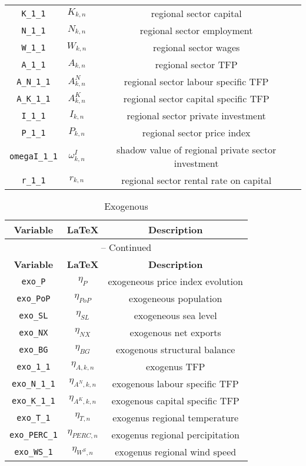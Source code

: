 \begin{center}
\begin{longtable}{ccc}
\texttt{K\_1\_1} & ${K_{k,n}}$ & regional sector capital\\
\texttt{N\_1\_1} & ${N_{k,n}}$ & regional sector employment\\
\texttt{W\_1\_1} & ${W_{k,n}}$ & regional sector wages\\
\texttt{A\_1\_1} & ${A_{k,n}}$ & regional sector TFP\\
\texttt{A\_N\_1\_1} & ${A^{N}_{k,n}}$ & regional sector labour specific TFP\\
\texttt{A\_K\_1\_1} & ${A^{K}_{k,n}}$ & regional sector capital specific TFP\\
\texttt{I\_1\_1} & ${I_{k,n}}$ & regional sector private investment\\
\texttt{P\_1\_1} & ${P_{k,n}}$ & regional sector price index\\
\texttt{omegaI\_1\_1} & ${\omega^I_{k,n}}$ & shadow value of regional private sector investment\\
\texttt{r\_1\_1} & ${r_{k,n}}$ & regional sector rental rate on capital\\
\hline%
\end{longtable}
\end{center}
\begin{center}
\begin{longtable}{ccc}
\caption{Exogenous}\\%
\hline%
\multicolumn{1}{c}{\textbf{Variable}} &
\multicolumn{1}{c}{\textbf{\LaTeX}} &
\multicolumn{1}{c}{\textbf{Description}}\\%
\hline\hline%
\endfirsthead
\multicolumn{3}{c}{{\tablename} \thetable{} -- Continued}\\%
\hline%
\multicolumn{1}{c}{\textbf{Variable}} &
\multicolumn{1}{c}{\textbf{\LaTeX}} &
\multicolumn{1}{c}{\textbf{Description}}\\%
\hline\hline%
\endhead
\texttt{exo\_P} & ${\eta_{P}}$ & exogeneous price index evolution\\
\texttt{exo\_PoP} & ${\eta_{PoP}}$ & exogeneous population\\
\texttt{exo\_SL} & ${\eta_{SL}}$ & exogeneous sea level\\
\texttt{exo\_NX} & ${\eta_{NX}}$ & exogenous net exports\\
\texttt{exo\_BG} & ${\eta_{BG}}$ & exogenous structural balance\\
\texttt{exo\_1\_1} & ${\eta_{A,k,n}}$ & exogenus TFP\\
\texttt{exo\_N\_1\_1} & ${\eta_{A^{N},k,n}}$ & exogenous labour specific TFP\\
\texttt{exo\_K\_1\_1} & ${\eta_{A^{K},k,n}}$ & exogenous capital specific TFP\\
\texttt{exo\_T\_1} & ${\eta_{T,n}}$ & exogenus regional temperature\\
\texttt{exo\_PERC\_1} & ${\eta_{PERC,n}}$ & exogenus regional percipitation\\
\texttt{exo\_WS\_1} & ${\eta_{W^{S},n}}$ & exogenus regional wind speed\\
\hline%
\end{longtable}
\end{center}
